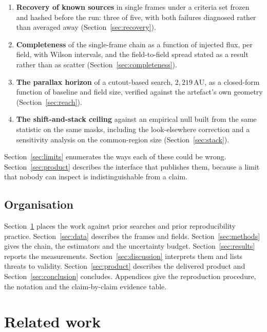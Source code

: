 \documentclass[11pt,a4paper]{article}
\newcommand{\unit}[1]{\,\mathrm{#1}}
\newcommand{\au}{\unit{AU}}
\begin{document}
\begin{enumerate}[leftmargin=1.5em,itemsep=2pt]
\item \textbf{Recovery of known sources} in single frames under a criteria set
frozen and hashed before the run: three of five, with both failures diagnosed
rather than averaged away (Section~\ref{sec:recovery}).
\item \textbf{Completeness} of the single-frame chain as a function of injected
flux, per field, with Wilson intervals, and the field-to-field spread stated as a
result rather than as scatter (Section~\ref{sec:completeness}).
\item \textbf{The parallax horizon} of a cutout-based search, $2{,}219\au$, as a
closed-form function of baseline and field size, verified against the artefact's
own geometry (Section~\ref{sec:reach}).
\item \textbf{The shift-and-stack ceiling} against an empirical null built from the
same statistic on the same masks, including the look-elsewhere correction and a
sensitivity analysis on the common-region size (Section~\ref{sec:stack}).
\end{enumerate}

Section~\ref{sec:limits} enumerates the ways each of these could be wrong.
Section~\ref{sec:product} describes the interface that publishes them, because a
limit that nobody can inspect is indistinguishable from a claim.

\subsection{Organisation}
Section~\ref{sec:related} places the work against prior searches and prior
reproducibility practice. Section~\ref{sec:data} describes the frames and fields.
Section~\ref{sec:methods} gives the chain, the estimators and the uncertainty
budget. Section~\ref{sec:results} reports the measurements.
Section~\ref{sec:discussion} interprets them and lists threats to validity.
Section~\ref{sec:product} describes the delivered product and
Section~\ref{sec:conclusion} concludes. Appendices give the reproduction
procedure, the notation and the claim-by-claim evidence table.

\section{Related work}\label{sec:related}
\end{document}
